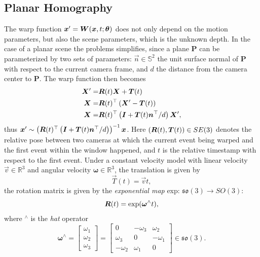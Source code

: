 \subsection{Planar Homography}

\label{sec:planar_homo}
The warp function $\vec{x}'=\mat{W}(\vec{x},t;\bm{\theta})$ does not only
depend on the motion parameters, but also the scene parameters, which
is the unknown depth.  In the case of a planar scene the problems
simplifies, since a plane $\mathbf{P}$ can be parameterized by two
sets of parameters: $\vec{n}\in\mathbb{S}^2$ the unit surface normal
of $\mathbf{P}$ with respect to the current camera frame, and $d$ the
distance from the camera center to $\mathbf{P}$. The warp function
then becomes
\begin{align}
  \vec{X}'=&\mat{R}(t)\vec{X}+\vec{T}(t)\\
  \vec{X}=&\mat{R}(t)^\top\left(\vec{X}'-\vec{T}(t)\right)\\
  \vec{X}=&\mat{R}(t)^\top\left(\mat{I}+\vec{T}(t)\vec{n}^\top/d\right)\vec{X}',  \label{eq:planar_homo_0}
\end{align}
thus
$\vec{x}'\sim\left(\mat{R}(t)^\top\left(\mat{I}+\vec{T}(t)\vec{n}^\top/d\right)\right)^{-1}\vec{x}$.
Here $(\mat{R}(t), \vec{T}(t))\in SE(3)$ denotes the relative pose
between two cameras at which the current event being warped and the
first event within the window happened, and $t$ is the relative
timestamp with respect to the first event. Under a constant velocity
model with linear velocity $\vec{v}\in\mathbb{R}^3$ and angular
velocity $\bm{\omega}\in\mathbb{R}^3$, the translation is given by
\begin{equation}
  \label{eq:translation}
  \vec{T}(t)=\vec{v}t,
\end{equation}
the rotation matrix is given by the \textit{exponential map} exp:
$\mathfrak{so}(3)\rightarrow SO(3)$:
\begin{equation}
  \label{eq:rotation}
  \mat{R}(t)=\mathrm{exp}(\bm{\omega}^\wedge t),
\end{equation}
where $^\wedge$ is the \textit{hat} operator
\begin{equation}
  \label{eq:hat}
  \bm{\omega}^\wedge=
  \begin{bmatrix}
    \omega_1\\\omega_2\\\omega_3
  \end{bmatrix}
  =
  \begin{bmatrix}
    0&-\omega_3&\omega_2\\
    \omega_3&0&-\omega_1\\
    -\omega_2&\omega_1&0
  \end{bmatrix}
  \in\mathfrak{so}(3).
\end{equation}

